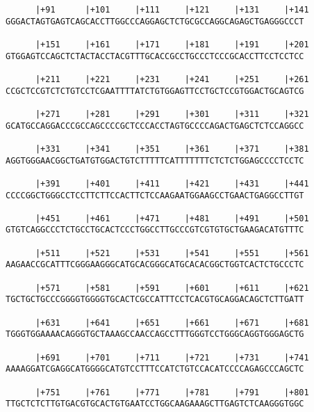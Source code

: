\documentclass{article}
\begin{document}
\begin{Verbatim}
      |+91      |+101     |+111     |+121     |+131     |+141
GGGACTAGTGAGTCAGCACCTTGGCCCAGGAGCTCTGCGCCAGGCAGAGCTGAGGGCCCT
                                                            
      |+151     |+161     |+171     |+181     |+191     |+201
GTGGAGTCCAGCTCTACTACCTACGTTTGCACCGCCTGCCCTCCCGCACCTTCCTCCTCC
                                                            
      |+211     |+221     |+231     |+241     |+251     |+261
CCGCTCCGTCTCTGTCCTCGAATTTTATCTGTGGAGTTCCTGCTCCGTGGACTGCAGTCG
                                                            
      |+271     |+281     |+291     |+301     |+311     |+321
GCATGCCAGGACCCGCCAGCCCCGCTCCCACCTAGTGCCCCAGACTGAGCTCTCCAGGCC
                                                            
      |+331     |+341     |+351     |+361     |+371     |+381
AGGTGGGAACGGCTGATGTGGACTGTCTTTTTCATTTTTTTCTCTCTGGAGCCCCTCCTC
                                                            
      |+391     |+401     |+411     |+421     |+431     |+441
CCCCGGCTGGGCCTCCTTCTTCCACTTCTCCAAGAATGGAAGCCTGAACTGAGGCCTTGT
                                                            
      |+451     |+461     |+471     |+481     |+491     |+501
GTGTCAGGCCCTCTGCCTGCACTCCCTGGCCTTGCCCGTCGTGTGCTGAAGACATGTTTC
                                                            
      |+511     |+521     |+531     |+541     |+551     |+561
AAGAACCGCATTTCGGGAAGGGCATGCACGGGCATGCACACGGCTGGTCACTCTGCCCTC
                                                            
      |+571     |+581     |+591     |+601     |+611     |+621
TGCTGCTGCCCGGGGTGGGGTGCACTCGCCATTTCCTCACGTGCAGGACAGCTCTTGATT
                                                            
      |+631     |+641     |+651     |+661     |+671     |+681
TGGGTGGAAAACAGGGTGCTAAAGCCAACCAGCCTTTGGGTCCTGGGCAGGTGGGAGCTG
                                                            
      |+691     |+701     |+711     |+721     |+731     |+741
AAAAGGATCGAGGCATGGGGCATGTCCTTTCCATCTGTCCACATCCCCAGAGCCCAGCTC
                                                            
      |+751     |+761     |+771     |+781     |+791     |+801
TTGCTCTCTTGTGACGTGCACTGTGAATCCTGGCAAGAAAGCTTGAGTCTCAAGGGTGGC
                                                            

\end{Verbatim}
\end{document}
